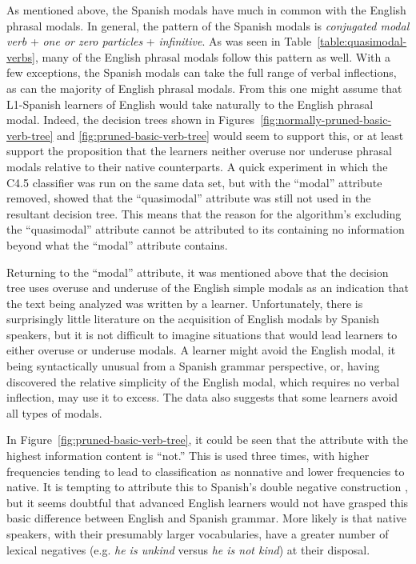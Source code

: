 \documentclass[main.tex]{subfiles}
\begin{document}
As mentioned above, the Spanish modals have much in common with the English phrasal modals. In general, the pattern of the Spanish modals is \textit{conjugated modal verb} + \textit{one or zero particles} + \textit{infinitive}. As was seen in Table~\ref{table:quasimodal-verbs}, many of the English phrasal modals follow this pattern as well. With a few exceptions, the Spanish modals can take the full range of verbal inflections, as can the majority of English phrasal modals. From this one might assume that L1-Spanish learners of English would take naturally to the English phrasal modal. Indeed, the decision trees shown in Figures~\ref{fig:normally-pruned-basic-verb-tree} and \ref{fig:pruned-basic-verb-tree} would seem to support this, or at least support the proposition that the learners neither overuse nor underuse phrasal modals relative to their native counterparts. A quick experiment in which the C4.5 classifier was run on the same data set, but with the ``modal'' attribute removed, showed that the ``quasimodal'' attribute was still not used in the resultant decision tree. This means that the reason for the algorithm's excluding the ``quasimodal'' attribute cannot be attributed to its containing no information beyond what the ``modal'' attribute contains.

Returning to the ``modal'' attribute, it was mentioned above that the decision tree uses overuse and underuse of the English simple modals as an indication that the text being analyzed was written by a learner. Unfortunately, there is surprisingly little literature on the acquisition of English modals by Spanish speakers, but it is not difficult to imagine situations that would lead learners to either overuse or underuse modals. A learner might avoid the English modal, it being syntactically unusual from a Spanish grammar perspective, or, having discovered the relative simplicity of the English modal, which requires no verbal inflection, may use it to excess. The data also suggests that some learners avoid all types of modals.

In Figure~\ref{fig:pruned-basic-verb-tree}, it could be seen that the attribute with the highest information content is ``not.'' This is used three times, with higher frequencies tending to lead to classification as nonnative and lower frequencies to native. It is tempting to attribute this to Spanish's double negative construction \citep[pp. 344-5]{butt}, but it seems doubtful that advanced English learners would not have grasped this basic difference between English and Spanish grammar. More likely is that native speakers, with their presumably larger vocabularies, have a greater number of lexical negatives (e.g. \textit{he is unkind} versus \textit{he is not kind}) at their disposal.
\end{document}
